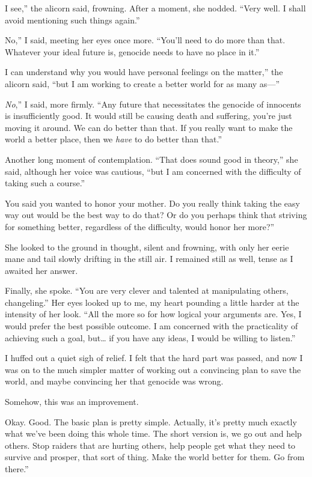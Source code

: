 \leavevmode{}I see,” the alicorn said, frowning. After a moment, she nodded. “Very well. I shall avoid mentioning such things again.”

\leavevmode{}No,” I said, meeting her eyes once more. “You’ll need to do more than that. Whatever your ideal future is, genocide needs to have no place in it.”

\leavevmode{}I can understand why you would have personal feelings on the matter,” the alicorn said, “but I am working to create a better world for as many as—”

\leavevmode{}\textit{No},” I said, more firmly. “Any future that necessitates the genocide of innocents is insufficiently good. It would still be causing death and suffering, you’re just moving it around. We can do better than that. If you really want to make the world a better place, then we \textit{have} to do better than that.”

Another long moment of contemplation. “That does sound good in theory,” she said, although her voice was cautious, “but I am concerned with the difficulty of taking such a course.”

\leavevmode{}You said you wanted to honor your mother. Do you really think taking the easy way out would be the best way to do that? Or do you perhaps think that striving for something better, regardless of the difficulty, would honor her more?”

She looked to the ground in thought, silent and frowning, with only her eerie mane and tail slowly drifting in the still air. I remained still as well, tense as I awaited her answer.

Finally, she spoke. “You are very clever and talented at manipulating others, changeling.” Her eyes looked up to me, my heart pounding a little harder at the intensity of her look. “All the more so for how logical your arguments are. Yes, I would prefer the best possible outcome. I am concerned with the practicality of achieving such a goal, but… if you have any ideas, I would be willing to listen.”

I huffed out a quiet sigh of relief. I felt that the hard part was passed, and now I was on to the much simpler matter of working out a convincing plan to save the world, and maybe convincing her that genocide was wrong.

Somehow, this was an improvement.

\leavevmode{}Okay. Good. The basic plan is pretty simple. Actually, it’s pretty much exactly what we’ve been doing this whole time. The short version is, we go out and help others. Stop raiders that are hurting others, help people get what they need to survive and prosper, that sort of thing. Make the world better for them. Go from there.”

